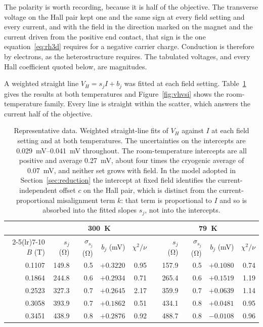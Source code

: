 \documentclass[11pt,a4paper]{article}
\begin{document}
The polarity is worth recording, because it is half of the objective. The transverse voltage
on the Hall pair kept one and the same sign at every field setting and every current, and
with the field in the direction marked on the magnet and the current driven from the positive
end contact, that sign is the one equation~\eqref{eq:rh3d} requires for a negative carrier
charge. Conduction is therefore by electrons, as the heterostructure requires. The tabulated
voltages, and every Hall coefficient quoted below, are magnitudes.

A weighted straight line $V_H = s_j I + b_j$ was fitted at each field setting.
Table~\ref{tab:slopes} gives the results at both temperatures and Figure~\ref{fig:vhvsi}
shows the room-temperature family. Every line is straight within the scatter, which answers
the current half of the objective.

\begin{table}[htbp]
\centering
\caption{Representative data. Weighted straight-line fits of $V_H$ against $I$ at each field
setting and at both temperatures. The uncertainties on the intercepts are
\qtyrange{0.029}{0.041}{\milli\volt} throughout. The room-temperature intercepts are all
positive and average \qty{0.27}{\milli\volt}, about four times the cryogenic average of
\qty{0.07}{\milli\volt}, and neither set grows with field. In the model adopted in
Section~\ref{sec:reduction} the intercept at fixed field identifies the current-independent
offset $c$ on the Hall pair, which is distinct from the current-proportional misalignment
term $k$: that term is proportional to $I$ and so is absorbed into the fitted slopes $s_j$,
not into the intercepts.}
\label{tab:slopes}
\small
\begin{tabular}{rrrrrcrrrr}
\toprule
& \multicolumn{4}{c}{\qty{300}{\kelvin}} & & \multicolumn{4}{c}{\qty{79}{\kelvin}} \\
\cmidrule(lr){2-5}\cmidrule(lr){7-10}
$B$ (\unit{\tesla}) & $s_j$ (\unit{\ohm}) & $\sigma_{s_j}$ (\unit{\ohm}) &
$b_j$ (\unit{\milli\volt}) &
$\chi^2/\nu$ & & $s_j$ (\unit{\ohm}) & $\sigma_{s_j}$ (\unit{\ohm}) &
$b_j$ (\unit{\milli\volt}) &
$\chi^2/\nu$ \\
\midrule
0.1107 & 149.8 & 0.5 & $+0.3220$ & 0.95 & & 157.9 & 0.5 & $+0.1080$ & 0.74 \\
0.1864 & 244.8 & 0.6 & $+0.2934$ & 0.71 & & 265.4 & 0.6 & $+0.1519$ & 1.19 \\
0.2523 & 327.3 & 0.7 & $+0.2645$ & 2.17 & & 359.9 & 0.7 & $+0.0639$ & 1.14 \\
0.3058 & 393.9 & 0.7 & $+0.1862$ & 0.51 & & 434.1 & 0.8 & $+0.0481$ & 0.95 \\
0.3451 & 438.9 & 0.8 & $+0.2876$ & 0.92 & & 488.7 & 0.8 & $-0.0108$ & 0.96 \\
\bottomrule
\end{tabular}
\end{table}
\end{document}
